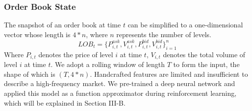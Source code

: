 \documentclass[conference]{IEEEtran}
\begin{document}
\subsubsection{Order Book State}
The snapshot of an order book at time $t$ can be simplified to a one-dimensional vector whose length is $4 * n$, where $n$ represents the number of levels.
\begin{equation}
LOB_t = \{P_{i,t}^{ask}, V_{i,t}^{ask}, P_{i,t}^{bid}, V_{i,t}^{bid}\}_{i=1}^n \tag{1}
\end{equation}
Where $P_{i,t}$ denotes the price of level $i$ at time $t$, $V_{i,t}$ denotes the total volume of level $i$ at time $t$. We adopt a rolling window of length $T$ to form the input, the shape of which is $(T, 4*n)$. Handcrafted features are limited and insufficient to describe a high-frequency market. We pre-trained a deep neural network and applied this model as a function approximator during reinforcement learning, which will be explained in Section III-B.
\end{document}
